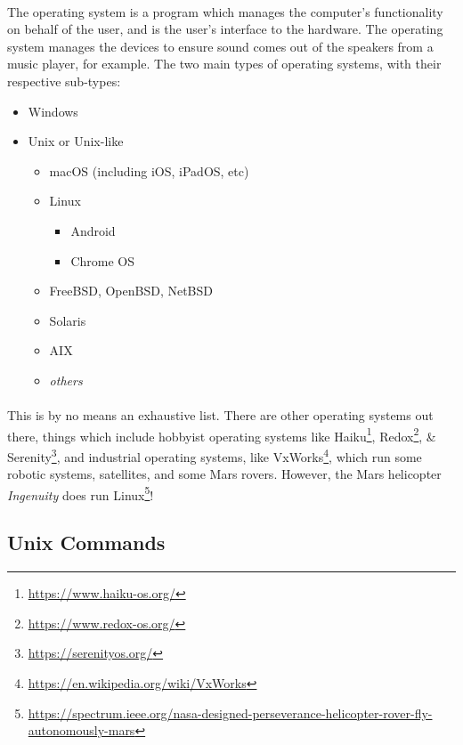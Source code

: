 \documentclass[letter,11pt]{article}
\begin{document}
\paragraph{}The operating system is a program which manages the computer's functionality on behalf of the user, and is the user's interface to the hardware. The operating system manages the devices to ensure sound comes out of the speakers from a music player, for example. The two main types of operating systems, with their respective sub-types:
\begin{itemize}
    \item Windows
    \item Unix or Unix-like
    \begin{itemize}
        \item macOS (including iOS, iPadOS, etc)
        \item Linux
        \begin{itemize}
            \item Android
            \item Chrome OS
        \end{itemize}
        \item FreeBSD, OpenBSD, NetBSD
        \item Solaris
        \item AIX
        \item \textit{others}
    \end{itemize}
\end{itemize}

\paragraph{}This is by no means an exhaustive list. There are other operating systems out there, things which include hobbyist operating systems like Haiku\footnote{\url{https://www.haiku-os.org/}}, Redox\footnote{\url{https://www.redox-os.org/}}, \& Serenity\footnote{\url{https://serenityos.org/}}, and industrial operating systems, like VxWorks\footnote{\url{https://en.wikipedia.org/wiki/VxWorks}}, which run some robotic systems, satellites, and some Mars rovers. However, the Mars helicopter \textit{Ingenuity} does run Linux\footnote{\url{https://spectrum.ieee.org/nasa-designed-perseverance-helicopter-rover-fly-autonomously-mars}}!

\subsection{Unix Commands}
\end{document}
